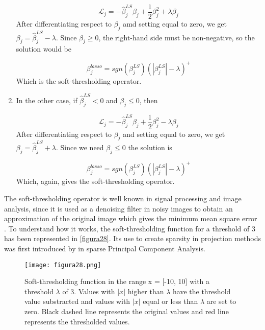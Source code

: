 \begin{enumerate}
    \begin{equation}
        \mathcal{L}_j = -\hat{\beta}^{LS}_j\beta_j+\frac{1}{2}\beta^2_j+\lambda\beta_j
    \end{equation}
    After differentiating respect to $\beta_j$ amd setting equal to zero, we get $\beta_j = \hat{\beta}^{LS}_j-\lambda$. Since $\beta_j \geq 0$, the right-hand side must be non-negative, so the solution would be
    
    \begin{equation}
        \beta_j^{lasso}=sgn(\beta_j^{LS})(|\beta_j^{LS}|-\lambda)^+
    \end{equation}
    Which is the soft-thresholding operator.
    \item In the other case, if $\hat{\beta}^{LS}_j < 0$ and $\beta_j \leq 0$, then
    
    \begin{equation}
        \mathcal{L}_j = -\hat{\beta}^{LS}_j\beta_j+\frac{1}{2}\beta^2_j-\lambda\beta_j
    \end{equation}
    After differentiating respect to $\beta_j$ and setting equal to zero, we get $\beta_j = \hat{\beta}^{LS}_j+\lambda$. Since we need $\beta_j \leq 0$ the solution is
    
    \begin{equation}
        \beta_j^{lasso}=sgn(\beta_j^{LS})(|\beta_j^{LS}|-\lambda)^+
    \end{equation}
    Which, again, gives the soft-thresholding operator.
\end{enumerate}

\vspace{20pt}
The soft-thresholding operator is well known in signal processing and image analysis, since it is used as a denoising filter in noisy images to obtain an approximation of the original image which gives the minimum mean square error \parencite{khare2005soft, joy2013denoising}. To understand how it works, the soft-thresholding function for a threshold of 3 has been represented in \autoref{figura28}. Its use to create sparsity in projection methods was first introduced by \textcite{zou2006sparse} in sparse Principal Component Analysis.
\vspace{10pt}

\begin{figure}[hbtp]
\centering
\texttt{[image: figura28.png]}
\caption[Soft-thresholding function]{Soft-thresholding function in the range x = [-10, 10] with a threshold $\lambda$ of 3. Values with $|x|$ higher than $\lambda$ have the threshold value substracted and values with $|x|$ equal or less than $\lambda$ are set to zero. Black dashed line represents the original values and red line represents the thresholded values.}
\label{figura28}
\end{figure}

